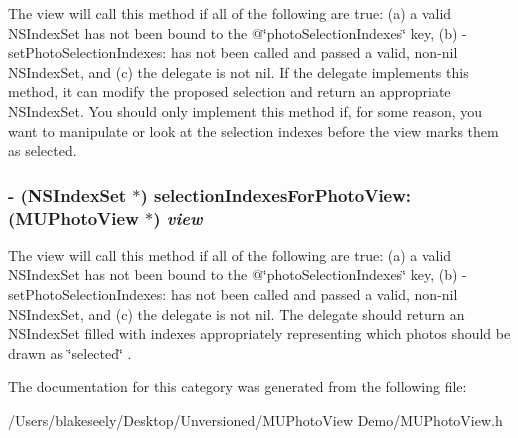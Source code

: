 The view will call this method if all of the following are true: (a) a valid NSIndex\-Set has not been bound to the @\char`\"{}photo\-Selection\-Indexes\char`\"{} key, (b) -set\-Photo\-Selection\-Indexes: has not been called and passed a valid, non-nil NSIndex\-Set, and (c) the delegate is not nil. If the delegate implements this method, it can modify the proposed selection and return an appropriate NSIndex\-Set. You should only implement this method if, for some reason, you want to manipulate or look at the selection indexes before the view marks them as selected. 
\subsubsection{\setlength{\rightskip}{0pt plus 5cm}- (NSIndex\-Set $\ast$) selection\-Indexes\-For\-Photo\-View: ({\bf MUPhoto\-View} $\ast$) {\em view}}\label{category_n_s_object(_m_u_photo_view_delegate)_aba153f99799dc20969fd3538cbc92ea}


The view will call this method if all of the following are true: (a) a valid NSIndex\-Set has not been bound to the @\char`\"{}photo\-Selection\-Indexes\char`\"{} key, (b) -set\-Photo\-Selection\-Indexes: has not been called and passed a valid, non-nil NSIndex\-Set, and (c) the delegate is not nil. The delegate should return an NSIndex\-Set filled with indexes appropriately representing which photos should be drawn as \char`\"{}selected\char`\"{} . 

The documentation for this category was generated from the following file:\begin{CompactItemize}
\item 
/Users/blakeseely/Desktop/Unversioned/MUPhoto\-View Demo/MUPhoto\-View.h\end{CompactItemize}
